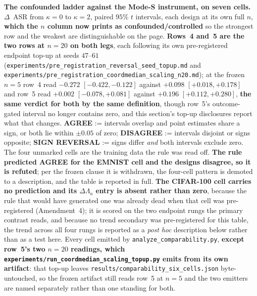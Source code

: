 \documentclass{article}
\begin{document}
\begin{table}[t]
\centering
\caption{\textbf{The confounded ladder against the Mode-S instrument, on seven cells.} $\Delta$~ASR from $\kappa{=}0$ to $\kappa{=}2$, paired $95\%$ $t$ intervals, each design at its own full $n$, \textbf{which the $n$ column now prints as confounded/controlled} so the strongest row and the weakest are distinguishable on the page. \textbf{Rows~4 and~5 are the two rows at $n{=}20$ on both legs}, each following its own pre-registered endpoint top-up at seeds $47$--$61$ (\texttt{experiments/\allowbreak pre\_registration\_\allowbreak reversal\_\allowbreak seed\_\allowbreak topup.md} and \texttt{experiments/\allowbreak pre\_registration\_\allowbreak coordmedian\_\allowbreak scaling\_\allowbreak n20.md}); at the frozen $n{=}5$ row~4 read $-0.272$ {$[-0.422,-0.122]$} against $+0.098$ {$[+0.018,+0.178]$} and row~5 read $+0.002$ {$[-0.078,+0.081]$} against $+0.196$ {$[+0.112,+0.280]$}, \textbf{the same verdict for both by the same definition}, though row~5's outcome-gated interval no longer contains zero, and this section's top-up disclosures report what that changes. \textbf{AGREE} := intervals overlap and point estimates share a sign, or both lie within $\pm0.05$ of zero; \textbf{DISAGREE} := intervals disjoint or signs opposite; \textbf{SIGN REVERSAL} := signs differ \emph{and} both intervals exclude zero. The four unmarked cells are the training data the rule was read off. \textbf{The rule predicted AGREE for the EMNIST cell and the designs disagree, so it is refuted}; per the frozen clause it is withdrawn, the four-cell pattern is demoted to a description, and the table is reported in full. \textbf{The CIFAR-100 cell carries no prediction and its $\Delta\Lambda_a$ entry is absent rather than zero}, because the rule that would have generated one was already dead when that cell was pre-registered (Amendment~4); it is scored on the two endpoint rungs the primary contrast reads, and because no trend secondary was pre-registered for this table, the trend across all four rungs is reported as a \emph{post hoc} description below rather than as a test here. Every cell emitted by \texttt{analyze\_comparability.py}, \textbf{except row~5's two $n{=}20$ readings, which \texttt{experiments/\allowbreak run\_coordmedian\_\allowbreak scaling\_\allowbreak topup.py} emits from its own artifact}: that top-up leaves \texttt{results/\allowbreak comparability\_\allowbreak six\_\allowbreak cells.json} byte-untouched, so the frozen artifact still reads row~5 at $n{=}5$ and the two emitters are named separately rather than one standing for both.}

\end{table}
\end{document}
